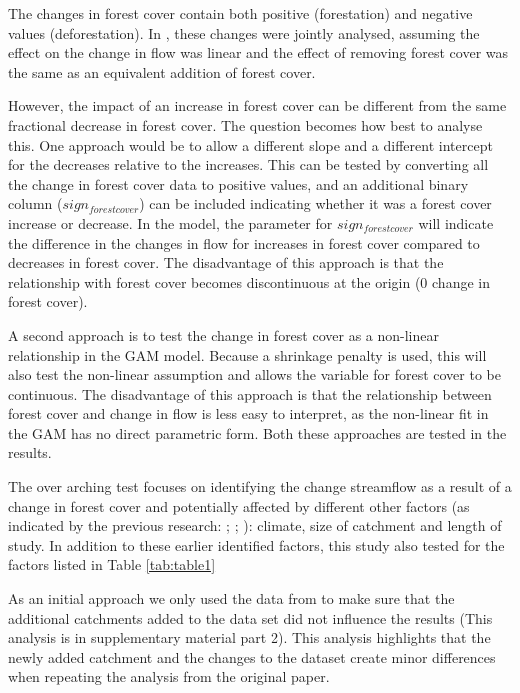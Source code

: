 \documentclass[]{elsarticle} %
\begin{document}
The changes in forest cover contain both positive (forestation) and negative values (deforestation). In \citet{zhang2017}, these changes were jointly analysed, assuming the effect on the change in flow was linear and the effect of removing forest cover was the same as an equivalent addition of forest cover.

However, the impact of an increase in forest cover can be different from the same fractional decrease in forest cover. The question becomes how best to analyse this. One approach would be to allow a different slope and a different intercept for the decreases relative to the increases.
This can be tested by converting all the change in forest cover data to positive values, and an additional binary column (\(sign_{forest cover}\)) can be included indicating whether it was a forest cover increase or decrease. In the model, the parameter for \(sign_{forest cover}\) will indicate the difference in the changes in flow for increases in forest cover compared to decreases in forest cover. The disadvantage of this approach is that the relationship with forest cover becomes discontinuous at the origin (0 change in forest cover).

A second approach is to test the change in forest cover as a non-linear relationship in the GAM model. Because a shrinkage penalty is used, this will also test the non-linear assumption and allows the variable for forest cover to be continuous. The disadvantage of this approach is that the relationship between forest cover and change in flow is less easy to interpret, as the non-linear fit in the GAM has no direct parametric form.
Both these approaches are tested in the results.

The over arching test focuses on identifying the change streamflow as a result of a change in forest cover and potentially affected by different other factors (as indicated by the previous research: \citet{zhang2017}; \citet{filoso2017}; \citet{zhou2015}): climate, size of catchment and length of study. In addition to these earlier identified factors, this study also tested for the factors listed in Table \ref{tab:table1}

As an initial approach we only used the data from \citet{zhang2017} to make sure that the additional catchments added to the data set did not influence the results (This analysis is in supplementary material part 2). This analysis highlights that the newly added catchment and the changes to the dataset create minor differences when repeating the analysis from the original paper.
\end{document}
